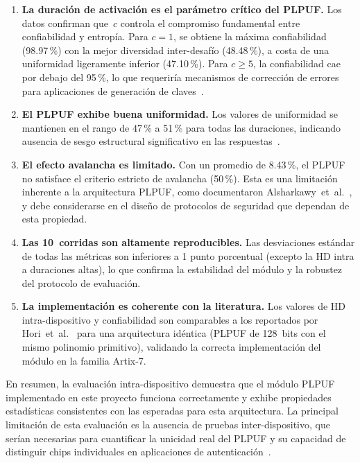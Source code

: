 \begin{enumerate}
  \item \textbf{La duración de activación es el parámetro crítico del
    PLPUF.} Los datos confirman que~$c$ controla el compromiso fundamental
    entre confiabilidad y entropía. Para $c = 1$, se obtiene la máxima
    confiabilidad (98.97\,\%) con la mejor diversidad inter-desafío
    (48.48\,\%), a costa de una uniformidad ligeramente inferior (47.10\,\%).
    Para $c \geq 5$, la confiabilidad cae por debajo del 95\,\%, lo que
    requeriría mecanismos de corrección de errores para aplicaciones de
    generación de claves~\cite{delvaux_2015_helper}.

  \item \textbf{El PLPUF exhibe buena uniformidad.} Los valores de
    uniformidad se mantienen en el rango de 47\,\% a 51\,\% para todas las
    duraciones, indicando ausencia de sesgo estructural significativo en las
    respuestas~\cite{maiti_2012_systematic}.

  \item \textbf{El efecto avalancha es limitado.} Con un promedio de
    8.43\,\%, el PLPUF no satisface el criterio estricto de avalancha
    (50\,\%). Esta es una limitación inherente a la arquitectura PLPUF, como
    documentaron Alsharkawy~et~al.~\cite{alsharkawy_2024_plpufs}, y debe
    considerarse en el diseño de protocolos de seguridad que dependan de esta
    propiedad.

  \item \textbf{Las 10~corridas son altamente reproducibles.} Las
    desviaciones estándar de todas las métricas son inferiores a 1 punto
    porcentual (excepto la HD intra a duraciones altas), lo que confirma la
    estabilidad del módulo y la robustez del protocolo de evaluación.

  \item \textbf{La implementación es coherente con la literatura.} Los
    valores de HD intra-dispositivo y confiabilidad son comparables a los
    reportados por Hori~et~al.~\cite{hori_2011_pseudolfsr} para una
    arquitectura idéntica (PLPUF de 128~bits con el mismo polinomio
    primitivo), validando la correcta implementación del módulo en la
    familia Artix-7.
\end{enumerate}

En resumen, la evaluación intra-dispositivo demuestra que el módulo PLPUF
implementado en este proyecto funciona correctamente y exhibe propiedades
estadísticas consistentes con las esperadas para esta arquitectura. La
principal limitación de esta evaluación es la ausencia de pruebas
inter-dispositivo, que serían necesarias para cuantificar la unicidad real
del PLPUF y su capacidad de distinguir chips individuales en aplicaciones de
autenticación~\cite{maiti_2012_systematic, wilde_2020_confidence}.

